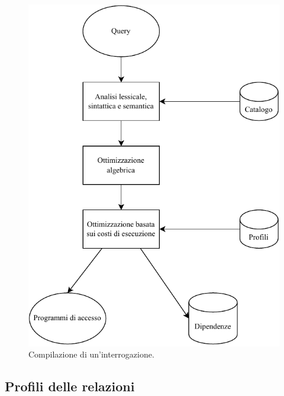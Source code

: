 \documentclass[a4paper]{article}
\begin{document}
	\begin{figure}[!htp]
		\centering
		\includegraphics[width=\textwidth]{img/compilazione_interrogazione.pdf}
		\caption{Compilazione di un'interrogazione.}
	\end{figure}\newpage

	\subsection{Profili delle relazioni}
	
\end{document}
